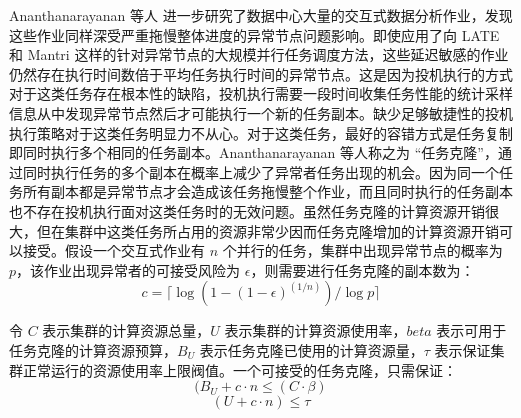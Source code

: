 Ananthanarayanan 等人 \cite{180304} 进一步研究了数据中心大量的交互式数据分析作业，发现这些作业同样深受严重拖慢整体进度的异常节点问题影响。即使应用了向 LATE \cite{Zaharia:2008:IMP:1855741.1855744} 和 Mantri \cite{Ananthanarayanan:2010:ROM:1924943.1924962} 这样的针对异常节点的大规模并行任务调度方法，这些延迟敏感的作业仍然存在执行时间数倍于平均任务执行时间的异常节点。这是因为投机执行的方式对于这类任务存在根本性的缺陷，投机执行需要一段时间收集任务性能的统计采样信息从中发现异常节点然后才可能执行一个新的任务副本。缺少足够敏捷性的投机执行策略对于这类任务明显力不从心。对于这类任务，最好的容错方式是任务复制即同时执行多个相同的任务副本。Ananthanarayanan 等人称之为 ``任务克隆''，通过同时执行任务的多个副本在概率上减少了异常者任务出现的机会。因为同一个任务所有副本都是异常节点才会造成该任务拖慢整个作业，而且同时执行的任务副本也不存在投机执行面对这类任务时的无效问题。虽然任务克隆的计算资源开销很大，但在集群中这类任务所占用的资源非常少因而任务克隆增加的计算资源开销可以接受。假设一个交互式作业有 $n$ 个并行的任务，集群中出现异常节点的概率为 $p$，该作业出现异常者的可接受风险为 $\epsilon$，则需要进行任务克隆的副本数为：
\begin{equation} \nonumber
c = \lceil \log(1-(1-\epsilon)^{(1/n)})/\log p \rceil
\end{equation}

令 $C$ 表示集群的计算资源总量，$U$ 表示集群的计算资源使用率，$beta$ 表示可用于任务克隆的计算资源预算，$B_U$ 表示任务克隆已使用的计算资源量，$\tau$ 表示保证集群正常运行的资源使用率上限阀值。一个可接受的任务克隆，只需保证：
\begin{equation} \nonumber
(B_U + c \cdot n \leq (C \cdot \beta)
\end{equation}
\begin{equation} \nonumber
(U + c \cdot n) \leq \tau
\end{equation}

